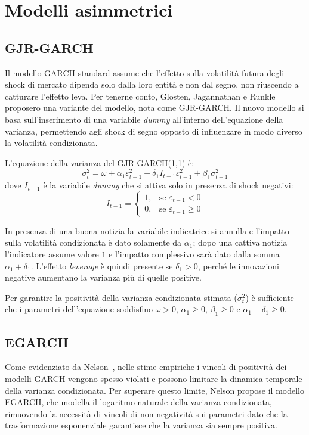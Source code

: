 \section{Modelli asimmetrici}
\label{sec:modelli-asimmetrici}

\subsection{GJR-GARCH}
\label{subsec:gjr-garch}
Il modello GARCH standard assume che l'effetto sulla volatilità futura degli shock di mercato dipenda solo dalla loro entità e non dal segno, non riuscendo a catturare l'effetto leva. 
Per tenerne conto, Glosten, Jagannathan e Runkle~\cite{glosten:gjr} proposero una variante del modello, nota come GJR-GARCH. 
Il nuovo modello si basa sull'inserimento di una variabile \emph{dummy} all'interno dell'equazione della varianza, permettendo agli shock di segno opposto di influenzare in modo diverso la volatilità condizionata.

L'equazione della varianza del GJR-GARCH(1,1) è:
\[
    \sigma_t^2 = \omega + \alpha_1 \varepsilon_{t-1}^2 + \delta_1 I_{t-1} \varepsilon_{t-1}^2 + \beta_1 \sigma_{t-1}^2
\]
dove $I_{t-1}$ è la variabile \emph{dummy} che si attiva solo in presenza di shock negativi:
\[
    I_{t-1} = 
    \begin{cases} 
        1, & \text{se } \varepsilon_{t-1} < 0 \\ 
        0, & \text{se } \varepsilon_{t-1} \geq 0 
    \end{cases}
\]

In presenza di una buona notizia la variabile indicatrice si annulla e l'impatto sulla volatilità condizionata è dato solamente da $\alpha_1$; dopo una cattiva notizia l'indicatore assume valore $1$ e l'impatto complessivo sarà dato dalla somma $\alpha_1 + \delta_1$. 
L'effetto \emph{leverage} è quindi presente se $\delta_1 > 0$, perché le innovazioni negative aumentano la varianza più di quelle positive.

Per garantire la positività della varianza condizionata stimata ($\sigma_t^2$) è sufficiente che i parametri dell'equazione soddisfino $\omega > 0$, $\alpha_1 \geq 0$, $\beta_1 \geq 0$ e $\alpha_1 + \delta_1 \geq 0$.


\subsection{EGARCH}
\label{subsec:egarch}
Come evidenziato da Nelson~\cite{nelson:conditional}, nelle stime empiriche i vincoli di positività dei modelli GARCH vengono spesso violati e possono limitare la dinamica temporale della varianza condizionata. 
Per superare questo limite, Nelson propose il modello EGARCH, che modella il logaritmo naturale della varianza condizionata, rimuovendo la necessità di vincoli di non negatività sui parametri dato che la trasformazione esponenziale garantisce che la varianza sia sempre positiva.


